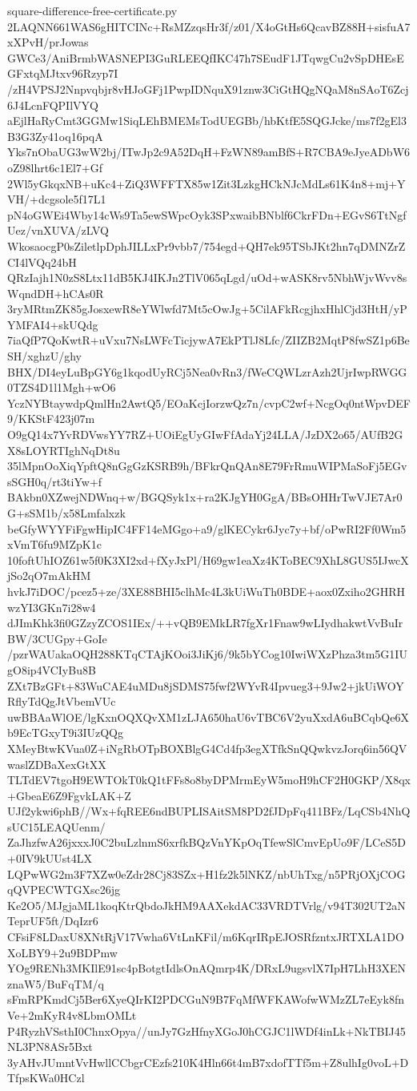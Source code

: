 \documentclass[11pt]{article}
\theoremstyle{definition}
\theoremstyle{remark}
\begin{document}
\begin{filecontents*}[overwrite]{square-difference-free-certificate.py}
2LAQNN661WAS6gHITCINc+RsMZzqsHr3f/z01/X4oGtHs6QcavBZ88H+sisfuA7xXPvH/prJowas
GWCe3/AniBrmbWASNEPI3GuRLEEQfIKC47h7SEudF1JTqwgCu2vSpDHEsEGFxtqMJtxv96Rzyp7I
/zH4VPSJ2Nnpvqbjr8vHJoGFj1PwpIDNquX91znw3CiGtHQgNQaM8nSAoT6Zcj6J4LcnFQPIlVYQ
aEjlHaRyCmt3GGMw1SiqLEhBMEMsTodUEGBb/hbKtfE5SQGJcke/ms7f2gEl3B3G3Zy41oq16pqA
Yks7nObaUG3wW2bj/ITwJp2c9A52DqH+FzWN89amBfS+R7CBA9eJyeADbW6oZ98lhrt6c1El7+Gf
2Wl5yGkqxNB+uKc4+ZiQ3WFFTX85w1Zit3LzkgHCkNJcMdLs61K4n8+mj+YVH/+dcgsole5f17L1
pN4oGWEi4Wby14cWs9Ta5ewSWpcOyk3SPxwaibBNblf6CkrFDn+EGvS6TtNgfUez/vnXUVA/zLVQ
WkosaocgP0sZiletlpDphJILLxPr9vbb7/754egd+QH7ek95TSbJKt2hn7qDMNZrZCI4lVQq24bH
QRzIajh1N0zS8Ltx11dB5KJ4IKJn2TlV065qLgd/uOd+wASK8rv5NbhWjvWvv8sWqndDH+hCAs0R
3ryMRtmZK85gJosxewR8eYWlwfd7Mt5cOwJg+5CilAFkRcgjhxHhlCjd3HtH/yPYMFAI4+skUQdg
7iaQfP7QoKwtR+uVxu7NsLWFcTicjywA7EkPTlJ8Lfc/ZIIZB2MqtP8fwSZ1p6BeSH/xghzU/ghy
BHX/DI4eyLuBpGY6g1kqodUyRCj5Nea0vRn3/fWeCQWLzrAzh2UjrIwpRWGG0TZS4D1l1Mgh+wO6
YczNYBtaywdpQmlHn2AwtQ5/EOaKcjIorzwQz7n/cvpC2wf+NcgOq0ntWpvDEF9/KKStF423j07m
O9gQ14x7YvRDVwsYY7RZ+UOiEgUyGIwFfAdaYj24LLA/JzDX2o65/AUfB2GX8sLOYRTIghNqDt8u
35lMpnOoXiqYpftQ8nGgGzKSRB9h/BFkrQnQAn8E79FrRmuWIPMaSoFj5EGvsSGH0q/rt3tiYw+f
BAkbn0XZwejNDWnq+w/BGQSyk1x+ra2KJgYH0GgA/BBsOHHrTwVJE7Ar0G+sSM1b/x58Lmfalxzk
beGfyWYYFiFgwHipIC4FF14eMGgo+a9/glKECykr6Jyc7y+bf/oPwRI2Ff0Wm5xVmT6fu9MZpK1c
10foftUhIOZ61w5f0K3XI2xd+fXyJxPl/H69gw1eaXz4KToBEC9XhL8GUS5IJwcXjSo2qO7mAkHM
hvkJ7iDOC/pcez5+ze/3XE88BHI5clhMc4L3kUiWuTh0BDE+aox0Zxiho2GHRHwzYI3GKn7i28w4
dJImKhk3fi0GZzyZCOS1IEx/++vQB9EMkLR7fgXr1Fnaw9wLIydhakwtVvBuIrBW/3CUGpy+GoIe
/pzrWAUakaOQH288KTqCTAjKOoi3JiKj6/9k5bYCog10IwiWXzPhza3tm5G1IUgO8ip4VCIyBu8B
ZXt7BzGFt+83WuCAE4uMDu8jSDMS75fwf2WYvR4Ipvueg3+9Jw2+jkUiWOYRflyTdQgJtVbemVUc
uwBBAaWlOE/lgKxnOQXQvXM1zLJA650haU6vTBC6V2yuXxdA6uBCqbQe6Xb9EcTGxyT9i3IUzQQg
XMeyBtwKVua0Z+iNgRbOTpBOXBlgG4Cd4fp3egXTfkSnQQwkvzJorq6in56QVwaslZDBaXexGtXX
TLTdEV7tgoH9EWTOkT0kQ1tFFs8o8byDPMrmEyW5moH9hCF2H0GKP/X8qx+GbeaE6Z9FgvkLAK+Z
UJf2ykwi6phB//Wx+fqREE6ndBUPLISAitSM8PD2fJDpFq411BFz/LqCSb4NhQsUC15LEAQUenm/
ZaJhzfwA26jxxxJ0C2buLzlnmS6xrfkBQzVnYKpOqTfewSlCmvEpUo9F/LCeS5D+0IV9kUUst4LX
LQPwWG2m3F7XZw0eZdr28Cj83SZx+H1fz2k5lNKZ/nbUhTxg/n5PRjOXjCOGqQVPECWTGXsc26jg
Ke2O5/MJgjaML1koqKtrQbdoJkHM9AAXekdAC33VRDTVrlg/v94T302UT2aNTeprUF5ft/DqIzr6
CFsiF8LDaxU8XNtRjV17Vwha6VtLnKFil/m6KqrIRpEJOSRfzntxJRTXLA1DOXoLBY9+2u9BDPmw
YOg9RENh3MKIlE91sc4pBotgtIdlsOnAQmrp4K/DRxL9ugsvlX7IpH7LhH3XENznaW5/BuFqTM/q
sFmRPKmdCj5Ber6XyeQIrKI2PDCGuN9B7FqMfWFKAWofwWMzZL7eEyk8fnVe+2mKyR4v8LbmOMLt
P4RyzhVSsthI0ChnxOpya//unJy7GzHfnyXGoJ0hCGJC1lWDf4inLk+NkTBIJ45NL3PN8ASr5Bxt
3yAHvJUmntVvHwllCCbgrCEzfs210K4Hln66t4mB7xdofTTf5m+Z8ulhIg0voL+DTfpsKWa0HCzl

\end{filecontents*}
\end{document}
